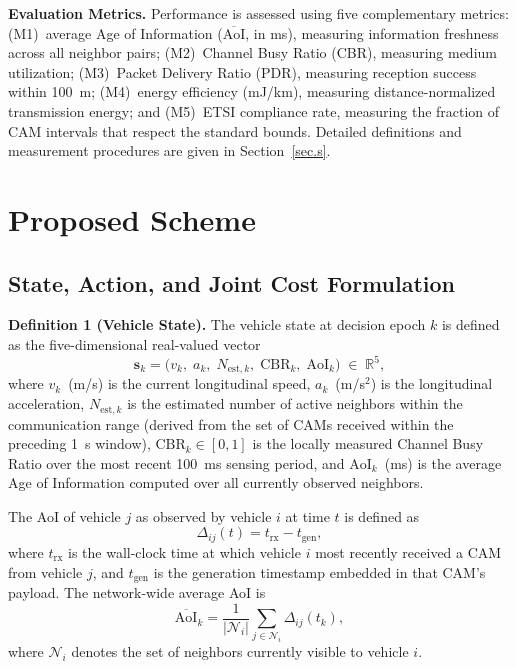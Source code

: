 \documentclass[journal]{IEEEtran}
\begin{document}
\textbf{Evaluation Metrics.}  Performance is assessed using five
complementary metrics: (M1)~average Age of Information
($\overline{\text{AoI}}$, in ms), measuring information freshness
across all neighbor pairs; (M2)~Channel Busy Ratio (CBR), measuring
medium utilization; (M3)~Packet Delivery Ratio (PDR), measuring
reception success within 100~m; (M4)~energy efficiency (mJ/km),
measuring distance-normalized transmission energy; and
(M5)~ETSI compliance rate, measuring the fraction of CAM intervals
that respect the standard bounds.  Detailed definitions and
measurement procedures are given in Section~\ref{sec.s}.


\section{Proposed Scheme}
\label{sec.prop}

\subsection{State, Action, and Joint Cost Formulation}
\label{subsec:1}

\textbf{Definition 1 (Vehicle State).}  The vehicle state at decision
epoch $k$ is defined as the five-dimensional real-valued vector
\begin{equation}
  \mathbf{s}_k =
  \bigl(v_k,\; a_k,\; N_{\text{est},k},\; \text{CBR}_k,\; \text{AoI}_k\bigr)
  \;\in\; \mathbb{R}^{5},
  \label{eq:state}
\end{equation}
where $v_k$~(m/s) is the current longitudinal speed,
$a_k$~(m/s$^2$) is the longitudinal acceleration,
$N_{\text{est},k}$ is the estimated number of active neighbors within
the communication range (derived from the set of CAMs received within
the preceding 1~s window), $\text{CBR}_k \in [0,1]$ is the
locally measured Channel Busy Ratio over the most recent 100~ms
sensing period, and $\text{AoI}_k$~(ms) is the average Age of
Information computed over all currently observed neighbors.

The AoI of vehicle $j$ as observed by vehicle $i$ at time $t$ is
defined as
\begin{equation}
  \Delta_{ij}(t) = t_{\text{rx}} - t_{\text{gen}},
  \label{eq:aoi_def}
\end{equation}
where $t_{\text{rx}}$ is the wall-clock time at which vehicle $i$ most
recently received a CAM from vehicle $j$, and $t_{\text{gen}}$ is the
generation timestamp embedded in that CAM's payload.  The network-wide
average AoI is
\begin{equation}
  \overline{\text{AoI}}_k =
  \frac{1}{|{\mathcal{N}_i}|}
  \sum_{j \in \mathcal{N}_i} \Delta_{ij}(t_k),
  \label{eq:aoi_avg}
\end{equation}
where $\mathcal{N}_i$ denotes the set of neighbors currently visible to
vehicle $i$.
\end{document}
